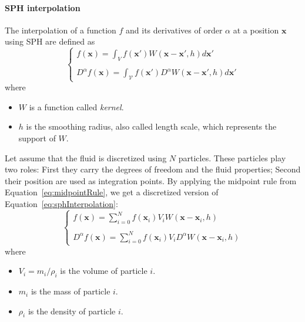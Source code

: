 \paragraph{SPH interpolation}
The interpolation of a function $f$ and its derivatives of order $\alpha$ at a position $\mathbf{x}$ using SPH are defined as
\begin{equation}
\label{eq:sphInterpolation}
\left\lbrace
\begin{array}{l}
\displaystyle f(\mathbf{x}) = \int_{V} f(\mathbf{x'})W(\mathbf{x}-\mathbf{x'}, h)d\mathbf{x'} \\ \\
\displaystyle D^{\alpha} f(\mathbf{x}) = \int_{\mathcal{V}} f(\mathbf{x'}) D^{\alpha} W(\mathbf{x}-\mathbf{x'}, h)d\mathbf{x'}
\end{array}
\right.
\end{equation}
where 
\begin{itemize}
	\item $W$ is a function called \emph{kernel}.
	\item $h$ is the smoothing radius, also called length scale, which represents the support of $W$.
\end{itemize} 
Let assume that the fluid is discretized using $N$ particles.
These particles play two roles: First they carry the degrees of freedom and the fluid properties; Second their position are used as integration points. By applying the midpoint rule from Equation~\eqref{eq:midpointRule}, we get a discretized version of Equation~\eqref{eq:sphInterpolation}:
\begin{equation}
\label{eq:sphFunction}
\left\lbrace
\begin{array}{l}
\displaystyle f(\mathbf{x}) = \sum_{i=0}^{N} f(\mathbf{x}_{i})V_{i} W(\mathbf{x}-\mathbf{x}_{i},h) \\ \\
\displaystyle D^{\alpha} f(\mathbf{x})= \sum_{i=0}^{N} f(\mathbf{x}_{i})V_{i} D^{\alpha} W(\mathbf{x}-\mathbf{x}_{i},h)
\end{array}
\right.
\end{equation}
where 
\begin{itemize}
	\item $V_{i} = m_{i}/\rho_{i}$ is the volume of particle $i$.
	\item $m_{i}$ is the mass of particle $i$.
	\item $\rho_{i}$ is the density of particle $i$.
\end{itemize}
